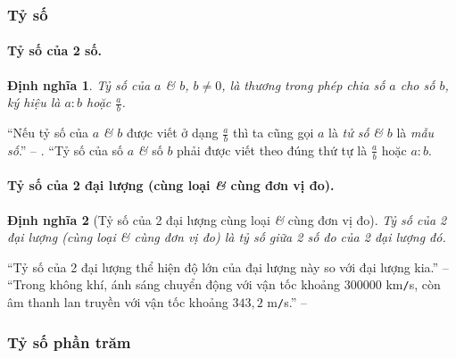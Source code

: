 \documentclass{article}
\numberwithin{equation}{section}
\newtheorem{definition}{Định nghĩa}[section]
\begin{document}
\subsubsection{Tỷ số}

\paragraph{Tỷ số của 2 số.}
\begin{definition}
	 \emph{Tỷ số} của $a$ \textit{\&} $b$, $b\ne 0$, là thương trong phép chia số $a$ cho số $b$, ký hiệu là $a:b$ hoặc $\frac{a}{b}$.
\end{definition}
``Nếu tỷ số của $a$ \textit{\&} $b$ được viết ở dạng $\frac{a}{b}$ thì ta cũng gọi $a$ là \textit{tử số} \textit{\&} $b$ là \textit{mẫu số}.'' -- \cite[p. 61]{Thai_Anh_Dat_Ha_Loan_Nam_Quang_Toan_6_tap_2}. ``Tỷ số của số $a$ \textit{\&} số $b$ phải được viết theo đúng thứ tự là $\frac{a}{b}$ hoặc $a:b$.

\paragraph{Tỷ số của 2 đại lượng (cùng loại \textit{\&} cùng đơn vị đo).}
\begin{definition}[Tỷ số của 2 đại lượng cùng loại \textit{\&} cùng đơn vị đo]
	\emph{Tỷ số của 2 đại lượng (cùng loại \textit{\&} cùng đơn vị đo)} là tỷ số giữa 2 số đo của 2 đại lượng đó.
\end{definition}
``Tỷ số của 2 đại lượng thể hiện độ lớn của đại lượng này so với đại lượng kia.'' -- \cite[p. 62]{Thai_Anh_Dat_Ha_Loan_Nam_Quang_Toan_6_tap_2} ``Trong không khí, ánh sáng chuyển động với vận tốc khoảng $300 000$ km\texttt{/}s, còn âm thanh lan truyền với vận tốc khoảng $343,2$ m\texttt{/}s.'' -- \cite[p. 63]{Thai_Anh_Dat_Ha_Loan_Nam_Quang_Toan_6_tap_2}

\subsubsection{Tỷ số phần trăm}
\end{document}
